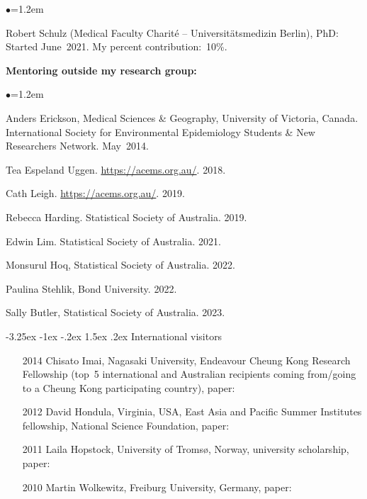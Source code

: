 \documentclass[a4paper,11pt]{article}
\makeatletter
\renewcommand\subsection{\@startsection{subsection}{2}{\z@}%
                                       {-3.25ex \@plus -1ex \@minus -.2ex}%
                                       {1.5ex \@plus .2ex}%
                                   {\normalfont\normalsize\bfseries\color{blue}}}
\renewcommand{\labelitemi}{$\bullet$}
\makeatother
\begin{document}
\begin{raggedright}
\begin{list}{\labelitemi}{\leftmargin=1.2em}

% 
\item Robert Schulz (Medical Faculty Charit\'{e} – Universit\"{a}tsmedizin Berlin), PhD: Started June~2021. My percent contribution:~10\%.
\end{list}

\textbf{Mentoring outside my research group:}

\begin{list}{\labelitemi}{\leftmargin=1.2em}\addtolength{\itemsep}{-0.5\baselineskip}
\item Anders Erickson, Medical Sciences \& Geography, University of Victoria, Canada. International Society for Environmental Epidemiology Students \& New Researchers Network. May~2014.
\item Tea Espeland Uggen. \href{ACEMS}{https://acems.org.au/}. 2018.
\item Cath Leigh. \href{ACEMS}{https://acems.org.au/}. 2019.
\item Rebecca Harding. Statistical Society of Australia. 2019.
\item Edwin Lim. Statistical Society of Australia. 2021.
\item Monsurul Hoq, Statistical Society of Australia. 2022.
\item Paulina Stehlik, Bond University. 2022.
\item Sally Butler, Statistical Society of Australia. 2023.
\end{list}

\subsection{International visitors}

\begin{itemize}%
  \item[2014] Chisato Imai, Nagasaki University, Endeavour Cheung Kong Research Fellowship (top~5 international and Australian recipients coming from/going to a Cheung Kong participating country), paper: 
  \item[2012] David Hondula, Virginia, USA, East Asia and Pacific Summer Institutes fellowship, National Science Foundation, paper: 
  \item[2011] Laila Hopstock, University of {T}roms{\o}, Norway, university scholarship, paper: 
  \item[2010] Martin Wolkewitz, Freiburg University, Germany, paper: 
\end{itemize}


\end{raggedright}
\end{document}
